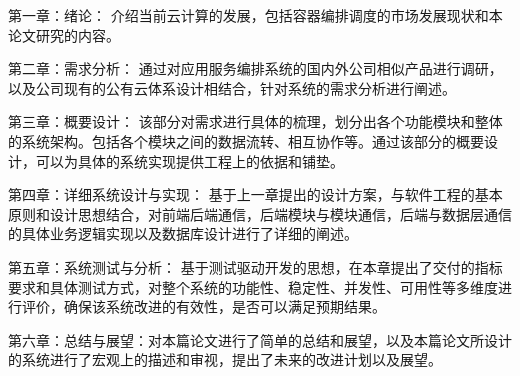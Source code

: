 第一章：绪论： 介绍当前云计算的发展，包括容器编排调度的市场发展现状和本论文研究的内容。

第二章：需求分析： 通过对应用服务编排系统的国内外公司相似产品进行调研，以及公司现有的公有云体系设计相结合，针对系统的需求分析进行阐述。

第三章：概要设计： 该部分对需求进行具体的梳理，划分出各个功能模块和整体的系统架构。包括各个模块之间的数据流转、相互协作等。通过该部分的概要设计，可以为具体的系统实现提供工程上的依据和铺垫。

第四章：详细系统设计与实现： 基于上一章提出的设计方案，与软件工程的基本原则和设计思想结合，对前端后端通信，后端模块与模块通信，后端与数据层通信的具体业务逻辑实现以及数据库设计进行了详细的阐述。

第五章：系统测试与分析： 基于测试驱动开发的思想，在本章提出了交付的指标要求和具体测试方式，对整个系统的功能性、稳定性、并发性、可用性等多维度进行评价，确保该系统改进的有效性，是否可以满足预期结果。

第六章：总结与展望：对本篇论文进行了简单的总结和展望，以及本篇论文所设计的系统进行了宏观上的描述和审视，提出了未来的改进计划以及展望。
